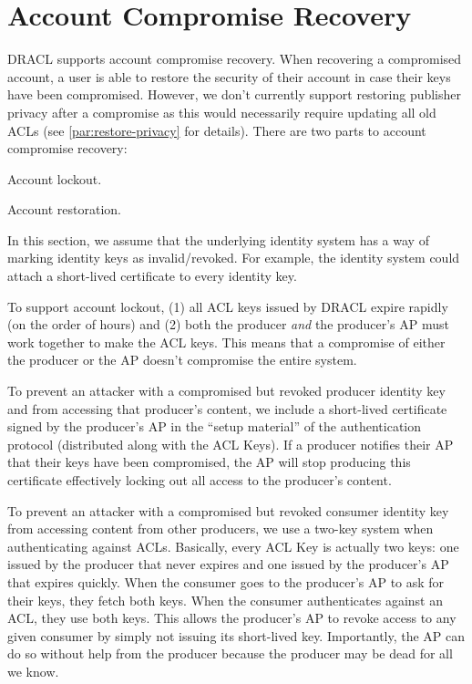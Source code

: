 \documentclass[pdftex,12pt,a4papaer,twoside,notitlepage]{report}
\begin{document}
\section{Account Compromise Recovery}
\label{sec:revoke}

DRACL supports account compromise recovery. When recovering a compromised
account, a user is able to restore the security of their account in case their
keys have been compromised. However, we don't currently support restoring
publisher privacy after a compromise as this would necessarily require updating
all old ACLs (see \cref{par:restore-privacy} for details). There are two parts
to account compromise recovery:

\begin{compactenum}
\item Account lockout.
\item Account restoration.
\end{compactenum}

In this section, we assume that the underlying identity system has a way of
marking identity keys as invalid/revoked. For example, the identity system could
attach a short-lived certificate to every identity key.

To support account lockout, (1) all ACL keys issued by DRACL expire rapidly (on
the order of hours) and (2) both the producer \emph{and} the producer's AP must
work together to make the ACL keys. This means that a compromise of either the
producer or the AP doesn't compromise the entire system.

To prevent an attacker with a compromised but revoked producer identity key and
from accessing that producer's content, we include a short-lived certificate
signed by the producer's AP in the ``setup material'' of the authentication
protocol (distributed along with the ACL Keys). If a producer notifies their AP
that their keys have been compromised, the AP will stop producing this
certificate effectively locking out all access to the producer's content.

To prevent an attacker with a compromised but revoked consumer identity key from
accessing content from other producers, we use a two-key system when
authenticating against ACLs. Basically, every ACL Key is actually two keys: one
issued by the producer that never expires and one issued by the producer's AP
that expires quickly. When the consumer goes to the producer's AP to ask for
their keys, they fetch both keys. When the consumer authenticates against an
ACL, they use both keys. This allows the producer's AP to revoke access to any
given consumer by simply not issuing its short-lived key. Importantly, the AP
can do so without help from the producer because the producer may be dead for
all we know.
\end{document}
